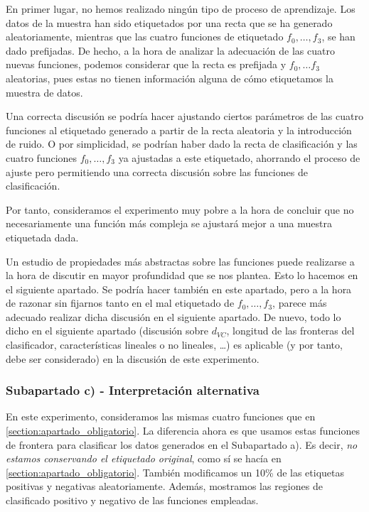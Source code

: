 \documentclass[11pt]{article}
\begin{document}
En primer lugar, no hemos realizado ningún tipo de proceso de aprendizaje. Los datos de la muestra han sido etiquetados por una recta que se ha generado aleatoriamente, mientras que las cuatro funciones de etiquetado $f_0, \ldots, f_3$, se han dado prefijadas. De hecho, a la hora de analizar la adecuación de las cuatro nuevas funciones, podemos considerar que la recta es prefijada y $f_0, \ldots f_3$ aleatorias, pues estas no tienen información alguna de cómo etiquetamos la muestra de datos.

Una correcta discusión se podría hacer ajustando ciertos parámetros de las cuatro funciones al etiquetado generado a partir de la recta aleatoria y la introducción de ruido. O por simplicidad, se podrían haber dado la recta de clasificación y las cuatro funciones $f_0, \ldots, f_3$ ya ajustadas a este etiquetado, ahorrando el proceso de ajuste pero permitiendo una correcta discusión sobre las funciones de clasificación.

Por tanto, consideramos el experimento muy pobre a la hora de concluir que no necesariamente una función más compleja se ajustará mejor a una muestra etiquetada dada.

Un estudio de propiedades más abstractas sobre las funciones puede realizarse a la hora de discutir en mayor profundidad que se nos plantea. Esto lo hacemos en el siguiente apartado. Se podría hacer también en este apartado, pero a la hora de razonar sin fijarnos tanto en el mal etiquetado de $f_0, \ldots, f_3$, parece más adecuado realizar dicha discusión en el siguiente apartado. De nuevo, todo lo dicho en el siguiente apartado (discusión sobre $d_{VC}$, longitud de las fronteras del clasificador, características lineales o no lineales, \ldots) es aplicable (y por tanto, debe ser considerado) en la discusión de este experimento.

\subsubsection{Subapartado c) - Interpretación alternativa} \label{section:apartado_extra}

En este experimento, consideramos las mismas cuatro funciones que en \ref{section:apartado_obligatorio}. La diferencia ahora es que usamos estas funciones de frontera para clasificar los datos generados en el Subapartado a). Es decir, \emph{no estamos conservando el etiquetado original}, como sí se hacía en \ref{section:apartado_obligatorio}. También modificamos un 10\% de las etiquetas positivas y negativas aleatoriamente. Además, mostramos las regiones de clasificado positivo y negativo de las funciones empleadas.
\end{document}

